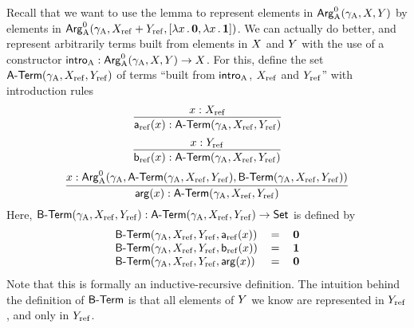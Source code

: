 \documentclass{schwicht}
\begin{document}
Recall that we want to use the lemma to represent elements in
$\mathsf{Arg}^{0}_{\mathrm{A}}(\gamma_{\mathrm{A}}, X, Y)$ by elements in $\mathsf{Arg}^{0}_{\mathrm{A}}(\gamma_{\mathrm{A}}, X_{\mathrm{ref}}
+Y_{\mathrm{ref}}, [\lambda x\,.\,\mathbf{0}, \lambda x\,.\,\mathbf{1}])$. We can actually
do better, and represent arbitrarily terms built from elements in $X$
and $Y$ with the use of a constructor $\mathsf{intro}_{\mathrm{A}} : \mathsf{Arg}^{0}_{\mathrm{A}}(\gamma_{\mathrm{A}}, X,
Y) \to X$. For this, define the set $\mathsf{A}\text{-}\mathsf{Term}(\gamma_{\mathrm{A}}, X_{\mathrm{ref}}, Y_{\mathrm{ref}})$
of terms ``built from $\mathsf{intro}_{\mathrm{A}}$, $X_{\mathrm{ref}}$ and $Y_{\mathrm{ref}}$'' with
introduction rules
%
\[
\infer{\termAref(x) : \Aterm(\gammaA, \Xref, \Yref)}{x : \Xref}
\]
%
%
\[
\infer{\termBref(x) : \Aterm(\gammaA, \Xref, \Yref)}{x : \Yref}
\]
%
%
\[
\infer{\termArg(x) : \Aterm(\gammaA, \Xref, \Yref)}{x : \ArgAp(\gammaA, \Aterm(\gammaA, \Xref, \Yref), \Bterm(\gammaA, \Xref, \Yref))}
\]
Here, $\mathsf{B}\text{-}\mathsf{Term}(\gamma_{\mathrm{A}}, X_{\mathrm{ref}}, Y_{\mathrm{ref}}) : \mathsf{A}\text{-}\mathsf{Term}(\gamma_{\mathrm{A}}, X_{\mathrm{ref}}, Y_{\mathrm{ref}}) \to \mathsf{Set}$ is defined by
\[
\begin{tabular}{lcr}
$\Bterm(\gammaA, \Xref, \Yref, \termAref(x))$ & $=$ & $\zero$ \\
$\Bterm(\gammaA, \Xref, \Yref, \termBref(x))$ & $=$ & $\one$  \\
$\Bterm(\gammaA, \Xref, \Yref, \termArg(x))$  & $=$ & $\zero$
\end{tabular}
\]
Note that this is formally an inductive-recursive definition.
The intuition behind the definition of $\mathsf{B}\text{-}\mathsf{Term}$ is that all elements of
$Y$ we know are represented in $Y_{\mathrm{ref}}$, and only in $Y_{\mathrm{ref}}$. 
\end{document}

